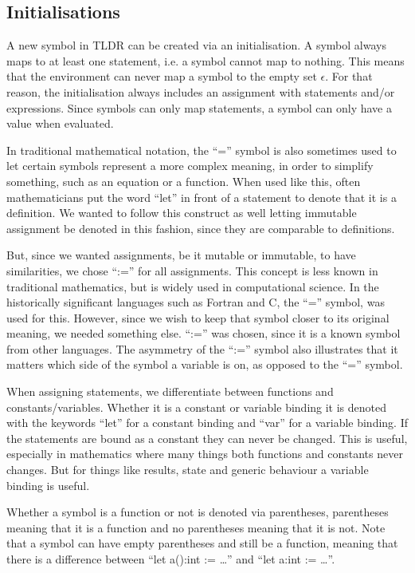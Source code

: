 \subsection{Initialisations}\label{subsec:initialisations}
A new symbol in TLDR can be created via an initialisation. A symbol always maps to at least one statement, i.e. a symbol cannot map to nothing. This means that the environment can never map a symbol to the empty set $\epsilon$. For that reason, the initialisation always includes an assignment with statements and/or expressions. Since symbols can only map statements, a symbol can only have a value when evaluated.

In traditional mathematical notation, the \enquote{=} symbol is also sometimes used to let certain symbols represent a more complex meaning, in order to simplify something, such as an equation or a function. When used like this, often mathematicians put the word \enquote{let} in front of a statement to denote that it is a definition. We wanted to follow this construct as well letting immutable assignment be denoted in this fashion, since they are comparable to definitions. 

But, since we wanted assignments, be it mutable or immutable, to have similarities, we chose \enquote{:=} for all assignments. This concept is less known in traditional mathematics, but is widely used in computational science. In the historically significant languages such as Fortran and C, the \enquote{=} symbol, was used for this. However, since we wish to keep that symbol closer to its original meaning, we needed something else. \enquote{:=} was chosen, since it is a known symbol from other languages. The asymmetry of the \enquote{:=} symbol also illustrates that it matters which side of the symbol a variable is on, as opposed to the \enquote{=} symbol.

When assigning statements, we differentiate between functions and constants/variables. Whether it is a constant or variable binding it is denoted with the keywords \enquote{let} for a constant binding and \enquote{var} for a variable binding. If the statements are bound as a constant they can never be changed. This is useful, especially in mathematics where many things both functions and constants never changes. But for things like results, state and generic behaviour a variable binding is useful.

Whether a symbol is a function or not is denoted via parentheses, parentheses meaning that it is a function and no parentheses meaning that it is not. Note that a symbol can have empty parentheses and still be a function, meaning that there is a difference between \enquote{let a():int := \dots} and \enquote{let a:int := \dots}.

